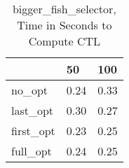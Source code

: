 \begin{table}
\caption{bigger\_fish\_selector, Time in Seconds to Compute CTL}
\label{bigger_fish_selector_CTL_time}
\begin{tabular}{lll}
\toprule
 & 50 & 100 \\
\midrule
no\_opt & 0.24 & 0.33 \\
last\_opt & 0.30 & 0.27 \\
first\_opt & 0.23 & 0.25 \\
full\_opt & 0.24 & 0.25 \\
\bottomrule
\end{tabular}
\end{table}
